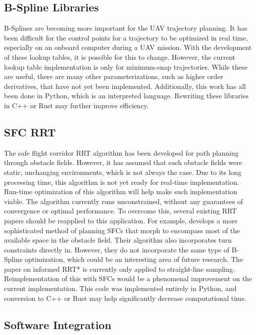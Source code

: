 \subsection{B-Spline Libraries}
B-Splines are becoming more important for the UAV trajectory planning.
It has been difficult for the control points for a trajectory to be optimized in real time, especially on an onboard computer during a UAV mission.
With the development of these lookup tables, it is possible for this to change.
However, the current lookup table implementation is only for minimum-snap trajectories.
While these are useful, there are many other parameterizations, such as higher order derivatives, that have not yet been implemented.
Additionally, this work has all been done in Python, which is an interpreted language.
Rewriting these libraries in C++ or Rust may further improve efficiency.

\subsection{SFC RRT}

The safe flight corridor RRT algorithm has been developed for path planning through obstacle fields.
However, it has assumed that such obstacle fields were static, unchanging environments, which is not always the case.
Due to its long processing time, this algorithm is not yet ready for real-time implementation.
Run-time optimization of this algorithm will help make such implementation viable. 
The algorithm currently runs unconstrained, without any guarantees of convergence or optimal performance.
To overcome this, several existing RRT papers should be reapplied to this application.
For example, \cite{SUN2025103174} develops a more sophisticated method of planning SFCs that morph to encompass most of the available space in the obstacle field.
Their algorithm also incorporates turn constraints directly in.
However, they do not incorporate the same type of B-Spline optimization, which could be an interesting area of future research.
The paper on informed RRT* \cite{Gammell-2014-7921} is currently only applied to straight-line sampling.
Reimplementation of this with SFCs would be a phenomenal improvement on the current implementation.
This code was implemented entirely in Python, and conversion to C++ or Rust may help significantly decrease computational time.

\subsection{Software Integration}

